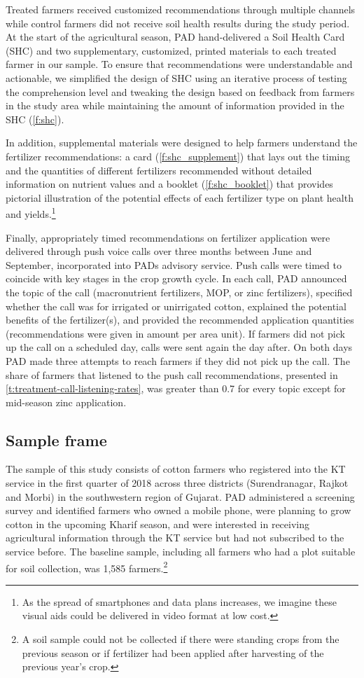 \documentclass{article}
\begin{document}
Treated farmers received customized recommendations through multiple channels while control farmers did not receive soil health results during the study period. At the start of the agricultural season, PAD hand-delivered a Soil Health Card (SHC) and two supplementary, customized, printed materials to each treated farmer in our sample. To ensure that recommendations were understandable and actionable, we simplified the design of SHC using an iterative process of testing the comprehension level and tweaking the design based on feedback from farmers in the study area while maintaining the amount of information provided in the SHC (\ref{f:shc}).

In addition, supplemental materials were designed to help farmers understand the fertilizer recommendations: a card (\ref{f:shc_supplement}) that lays out the timing and the quantities of different fertilizers recommended without detailed information on nutrient values and a booklet (\ref{f:shc_booklet}) that provides pictorial illustration of the potential effects of each fertilizer type on plant health and yields.\footnote{As the spread of smartphones and data plans increases, we imagine these visual aids could be delivered in video format at low cost.}

Finally, appropriately timed recommendations on fertilizer application were delivered through push voice calls over three months between June and September, incorporated into PADs advisory service. Push calls were timed to coincide with key stages in the crop growth cycle. In each call, PAD announced the topic of the call (macronutrient fertilizers, MOP, or zinc fertilizers), specified whether the call was for irrigated or unirrigated cotton, explained the potential benefits of the fertilizer(s), and provided the recommended application quantities (recommendations were given in amount per area unit). If farmers did not pick up the call on a scheduled day, calls were sent again the day after. On both days PAD made three attempts to reach farmers if they did not pick up the call. The share of farmers that listened to the push call recommendations, presented in \ref{t:treatment-call-listening-rates}, was greater than 0.7 for every topic except for mid-season zinc application. 

\subsection{Sample frame}

The sample of this study consists of cotton farmers who registered into the KT service in the first quarter of 2018 across three districts (Surendranagar, Rajkot and Morbi) in the southwestern region of Gujarat. PAD administered a screening survey and identified farmers who owned a mobile phone, were planning to grow cotton in the upcoming Kharif season, and were interested in receiving agricultural information through the KT service but had not subscribed to the service before. The baseline sample, including all farmers who had a plot suitable for soil collection, was 1,585 farmers.\footnote{A soil sample could not be collected if there were standing crops from the previous season or if fertilizer had been applied after harvesting of the previous year’s crop.}
\end{document}
